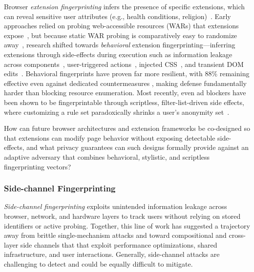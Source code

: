 Browser \textit{extension fingerprinting} infers the presence of specific extensions, which can reveal sensitive user attributes (e.g., health conditions, religion)~\cite{karamiCarnusExploringPrivacy2020}.
%
Early approaches relied on probing web-accessible resources (WARs) that extensions expose~\cite{starovXHOUNDQuantifyingFingerprintability2017,starovExtendedTrackingPowers2017,starovUnnecessarilyIdentifiableQuantifying2019}, but because static WAR probing is comparatively easy to randomize away~\cite{trickelEveryoneDifferentClientside2019}, research shifted towards \textit{behavioral} extension fingerprinting---inferring extensions through side-effects during execution such as information leakage across components~\cite{chenMystiqueUncoveringInformation2018}, user-triggered actions~\cite{solomosDangersHumanTouch2022}, injected CSS~\cite{laperdrixFingerprintingStyleDetecting2021}, and transient DOM edits~\cite{solomosEscapingConfinesTime2022}.
%
Behavioral fingerprints have proven far more resilient, with 88\% remaining effective even against dedicated countermeasures \cite{karamiCarnusExploringPrivacy2020}, making defense fundamentally harder than blocking resource enumeration.
%
Most recently, even ad blockers have been shown to be fingerprintable through scriptless, filter-list-driven side effects, where customizing a rule set paradoxically shrinks a user's anonymity set~\cite{chehade2025double}.

\begin{opbox}
How can future browser architectures and extension frameworks be co-designed so that extensions can modify page behavior without exposing detectable side-effects, and what privacy guarantees can such designs formally provide against an adaptive adversary that combines behavioral, stylistic, and scriptless fingerprinting vectors?
\end{opbox}


\subsubsection{Side-channel Fingerprinting} 
\label{sec:stateless-techniques-side-channel-fingperinting}

\textit{Side-channel fingerprinting} exploits unintended information leakage across browser, network, and hardware layers to track users without relying on stored identifiers or active probing.
%
Together, this line of work has suggested a trajectory away from brittle single-mechanism attacks and toward compositional and cross-layer side channels that that exploit performance optimizations, shared infrastructure, and user interactions.
%
Generally, side-channel attacks are challenging to detect and could be equally difficult to mitigate.


